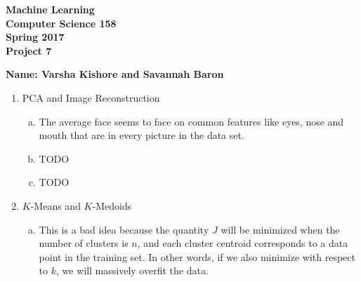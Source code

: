 \documentclass[11pt]{article}
\begin{document}
\newcommand{\Name}[1]{\noindent \textbf{Name:} #1 \\}
\newcommand{\pderiv}[2]{\frac{\partial #1}{\partial #2}}
\newcommand{\psderiv}[3]{\frac{\partial^2 #1}{\partial #2 \partial #3}}

\begin{center}
	\bf
	Machine Learning \\
	Computer Science 158 \\
	Spring 2017 \\
	\rm
	Project 7\\
\end{center}
\noindent \textbf{Name: Varsha Kishore and Savannah Baron} \\

\begin{enumerate}[1]
\item PCA and Image Reconstruction
\begin{enumerate}[(a)]
\item The average face seems to face on common features like eyes, nose and mouth that are in every picture in the data set. 
\item TODO
\item TODO
\end{enumerate}
\item $K$-Means and $K$-Medoids
\begin{enumerate}[(a)]
\item This is a bad idea because the quantity $J$ will be minimized when the number of clusters
is $n$, and each cluster centroid corresponds to a data point in the training set. In other words, if we
also minimize with respect to $k$, we will massively overfit the data. 
\end{enumerate}
\end{enumerate}
\end{document}
